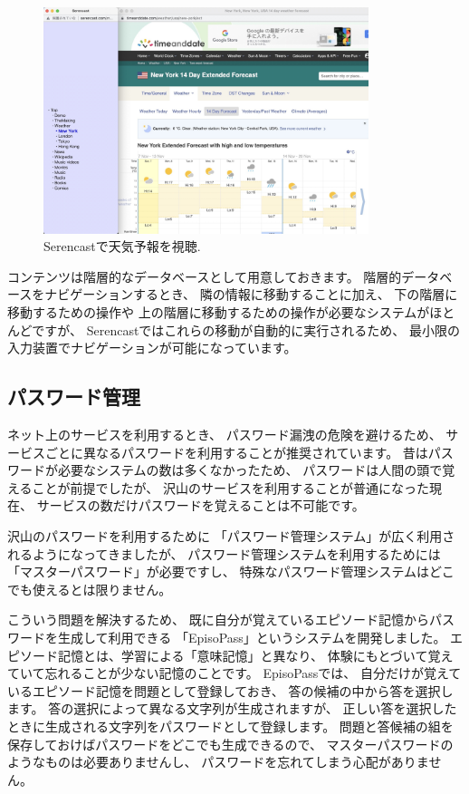 \documentclass[topics]{compsoft} %
\begin{document}
\begin{figure}[t]
  \includegraphics[width=9.5cm,bb=0 0 2510 1746]{figures/bb4027e2e210bc16450f0120a2987458.jpg}
  \caption{Serencastで天気予報を視聴.}
  \label{serencast}
\end{figure}

コンテンツは階層的なデータベースとして用意しておきます。
階層的データベースをナビゲーションするとき、
隣の情報に移動することに加え、
下の階層に移動するための操作や
上の階層に移動するための操作が必要なシステムがほとんどですが、
Serencastではこれらの移動が自動的に実行されるため、
最小限の入力装置でナビゲーションが可能になっています。

\subsection{パスワード管理}

ネット上のサービスを利用するとき、
パスワード漏洩の危険を避けるため、
サービスごとに異なるパスワードを利用することが推奨されています。
%
昔はパスワードが必要なシステムの数は多くなかったため、
パスワードは人間の頭で覚えることが前提でしたが、
沢山のサービスを利用することが普通になった現在、
サービスの数だけパスワードを覚えることは不可能です。

沢山のパスワードを利用するために
「パスワード管理システム」が広く利用されるようになってきましたが、
パスワード管理システムを利用するためには「マスターパスワード」が必要ですし、
特殊なパスワード管理システムはどこでも使えるとは限りません。

こういう問題を解決するため、
既に自分が覚えているエピソード記憶からパスワードを生成して利用できる
「EpisoPass」というシステムを開発しました\cite{episopass2}\cite{episopass1}。
エピソード記憶とは、学習による「意味記憶」と異なり、
体験にもとづいて覚えていて忘れることが少ない記憶のことです。
EpisoPassでは、
自分だけが覚えているエピソード記憶を問題として登録しておき、
答の候補の中から答を選択します。
答の選択によって異なる文字列が生成されますが、
正しい答を選択したときに生成される文字列をパスワードとして登録します。
問題と答候補の組を保存しておけばパスワードをどこでも生成できるので、
マスターパスワードのようなものは必要ありませんし、
パスワードを忘れてしまう心配がありません。
\end{document}
